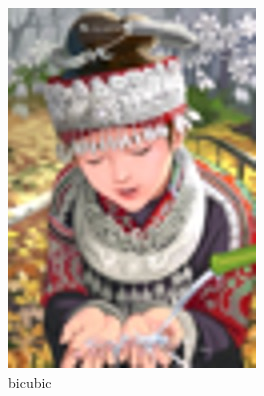 \begin{figure}[t]
\begin{subfigure}{.24\linewidth}
        \includegraphics[width=\linewidth]{images/comic_SRF_4_bicubic.jpg}
        \caption{bicubic}
        \label{fig:srgan_bicubic}
    \end{subfigure}
    \begin{subfigure}{.24\linewidth}

\end{subfigure}
\end{figure}
